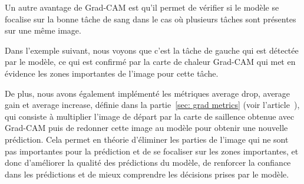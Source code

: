 Un autre avantage de Grad-CAM est qu'il permet de vérifier si le modèle se focalise sur la bonne tâche de sang
dans le cas où plusieurs tâches sont présentes sur une même image.

Dans l'exemple suivant, nous voyons que c'est la tâche de gauche qui est détectée par le modèle, ce qui est confirmé par la carte de chaleur Grad-CAM qui met en évidence les zones importantes de l'image pour cette tâche.


De plus, nous avons également implémenté les métriques average drop, average gain et average increase, définie dans la partie~\ref{sec: grad metrics} (voir l'article~\cite{opticam}), qui consiste à multiplier l'image de départ par la carte de saillence obtenue avec Grad-CAM puis de redonner cette image au modèle
pour obtenir une nouvelle prédiction.
Cela permet en théorie d'éliminer les parties de l'image qui ne sont pas importantes pour la prédiction et de se focaliser sur les zones importantes, et 
donc d'améliorer la qualité des prédictions du modèle, de renforcer la confiance dans les prédictions et de mieux comprendre les décisions prises par le modèle.





